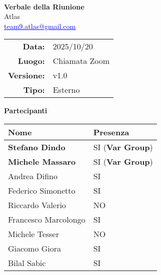 \documentclass[a4paper,12pt]{article}
\makeatletter
\newcommand{\Gruppo}{Atlas}
\newcommand{\Email}{\href{mailto:team9.atlas@gmail.com}{\textcolor{blue}{\underline{team9.atlas@gmail.com}}}}
\newcommand{\TitoloVerbale}{Verbale della Riunione}
\newcommand{\DataVerbale}{2025/10/20}
\newcommand{\LuogoVerbale}{Chiamata Zoom}
\newcommand{\LogoGruppo}{img/AtlasLogo.png} %
\newcommand{\VersioneVerbale}{v1.0} %
\newcommand{\VerbaleEsterno}{Esterno}
\makeatother
\begin{document}
\begin{titlepage}
    \centering

    \vspace*{0cm}
    \\
    [.5cm]
    {\Huge \textbf{\TitoloVerbale}}\\[0.8cm]
    {\LARGE \Gruppo}\\[0.1cm]
    {\Email}\\[1.2cm]

    \begin{tabular}{rl}
        \textbf{Data:} & \DataVerbale \\
        \textbf{Luogo:} & \LuogoVerbale \\
        \textbf{Versione:} & \VersioneVerbale \\
        \textbf{Tipo:} & \VerbaleEsterno \\
    \end{tabular}

    \vspace{1.2cm}

    {\large \textbf{Partecipanti}}\\[0.5cm]
    \begin{tabular}{l|l}
        \textbf{Nome} & \textbf{Presenza} \\
        \hline
        \textbf{Stefano Dindo} & SI (\textbf{Var Group})\\
        \textbf{Michele Massaro} & SI (\textbf{Var Group})\\
        Andrea Difino & SI \\
        Federico Simonetto & SI \\
        Riccardo Valerio & NO \\
        Francesco Marcolongo & SI \\
        Michele Tesser & NO \\
        Giacomo Giora & SI \\
        Bilal Sabic & SI \\
    \end{tabular}

\end{titlepage}
\end{document}
